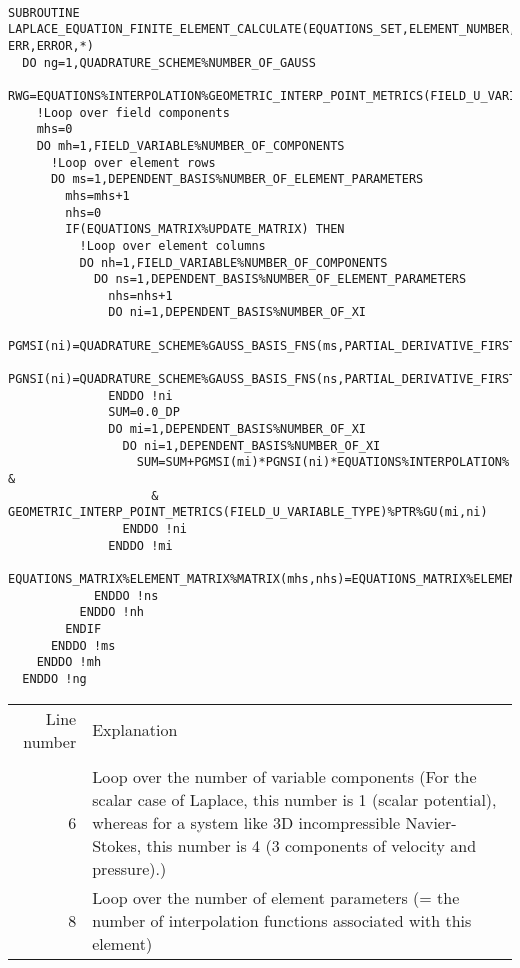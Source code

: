 {\footnotesize\tt
\begin{lstlisting}
SUBROUTINE LAPLACE_EQUATION_FINITE_ELEMENT_CALCULATE(EQUATIONS_SET,ELEMENT_NUMBER, ERR,ERROR,*)
  DO ng=1,QUADRATURE_SCHEME%NUMBER_OF_GAUSS
    RWG=EQUATIONS%INTERPOLATION%GEOMETRIC_INTERP_POINT_METRICS(FIELD_U_VARIABLE_TYPE)%PTR%JACOBIAN*QUADRATURE_SCHEME%GAUSS_WEIGHTS(ng)
    !Loop over field components
    mhs=0          
    DO mh=1,FIELD_VARIABLE%NUMBER_OF_COMPONENTS
      !Loop over element rows
      DO ms=1,DEPENDENT_BASIS%NUMBER_OF_ELEMENT_PARAMETERS
        mhs=mhs+1
        nhs=0
        IF(EQUATIONS_MATRIX%UPDATE_MATRIX) THEN
          !Loop over element columns
          DO nh=1,FIELD_VARIABLE%NUMBER_OF_COMPONENTS
            DO ns=1,DEPENDENT_BASIS%NUMBER_OF_ELEMENT_PARAMETERS
              nhs=nhs+1
              DO ni=1,DEPENDENT_BASIS%NUMBER_OF_XI
                PGMSI(ni)=QUADRATURE_SCHEME%GAUSS_BASIS_FNS(ms,PARTIAL_DERIVATIVE_FIRST_DERIVATIVE_MAP(ni),ng)
                PGNSI(ni)=QUADRATURE_SCHEME%GAUSS_BASIS_FNS(ns,PARTIAL_DERIVATIVE_FIRST_DERIVATIVE_MAP(ni),ng)
              ENDDO !ni
              SUM=0.0_DP
              DO mi=1,DEPENDENT_BASIS%NUMBER_OF_XI
                DO ni=1,DEPENDENT_BASIS%NUMBER_OF_XI
                  SUM=SUM+PGMSI(mi)*PGNSI(ni)*EQUATIONS%INTERPOLATION% &
                    & GEOMETRIC_INTERP_POINT_METRICS(FIELD_U_VARIABLE_TYPE)%PTR%GU(mi,ni)
                ENDDO !ni
              ENDDO !mi
              EQUATIONS_MATRIX%ELEMENT_MATRIX%MATRIX(mhs,nhs)=EQUATIONS_MATRIX%ELEMENT_MATRIX%MATRIX(mhs,nhs)+SUM*RWG
            ENDDO !ns
          ENDDO !nh
        ENDIF
      ENDDO !ms
    ENDDO !mh
  ENDDO !ng
\end{lstlisting}
}



\begin{tabular}{|rp{}|}
  \hline
  Line number & Explanation \\
  & \\
  6 & Loop over the number of variable components 
      (For the scalar case of Laplace, this number is 1 (scalar potential),
      whereas for a system like 3D incompressible Navier-Stokes, 
      this number is 4 (3 components of velocity and pressure).) \\
  8 & Loop over the number of element parameters (= the number of interpolation functions 
      associated with this element) \\
  \hline
\end{tabular}


